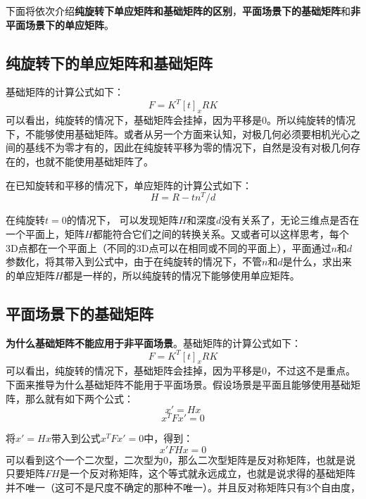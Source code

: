 下面将依次介绍\textbf{纯旋转下单应矩阵和基础矩阵的区别}，\textbf{平面场景下的基础矩阵}和\textbf{非平面场景下的单应矩阵}。

\subsection{纯旋转下的单应矩阵和基础矩阵}

基础矩阵的计算公式如下：
\begin{equation}
	F = K^T[t]_x RK
\end{equation}
可以看出，纯旋转的情况下，基础矩阵会挂掉，因为平移是0。所以纯旋转的情况下，不能够使用基础矩阵。或者从另一个方面来认知，对极几何必须要相机光心之间的基线不为零才有的，因此在纯旋转平移为零的情况下，自然是没有对极几何存在的，也就不能使用基础矩阵了。



在已知旋转和平移的情况下，单应矩阵的计算公式如下：
\begin{equation}
	H = R - tn^T/d
\end{equation}


在纯旋转$t = 0$的情况下， 可以发现矩阵$H$和深度$d$没有关系了，无论三维点是否在一个平面上，矩阵$H$都能符合它们之间的转换关系。又或者可以这样思考，每个3D点都在一个平面上（不同的3D点可以在相同或不同的平面上），平面通过$n$和$d$参数化，将其带入到公式中，由于在纯旋转的情况下，不管$n$和$d$是什么，求出来的单应矩阵$H$都是一样的，所以纯旋转的情况下能够使用单应矩阵。





\subsection{平面场景下的基础矩阵}


\textbf{为什么基础矩阵不能应用于非平面场景}。基础矩阵的计算公式如下：
\begin{equation}
	F = K^T[t]_x RK
\end{equation}
可以看出，纯旋转的情况下，基础矩阵会挂掉，因为平移是0，不过这不是重点。下面来推导为什么基础矩阵不能用于平面场景。假设场景是平面且能够使用基础矩阵，那么就有如下两个公式：
\begin{equation}
	x' = Hx
\end{equation}
\begin{equation}
	x^TFx' = 0
\end{equation}

将$x' = Hx$带入到公式$x^TFx'=0$中，得到：
\begin{equation}
	x'FHx = 0
\end{equation}
可以看到这个一个二次型，二次型为0，那么二次型矩阵是反对称矩阵，也就是说只要矩阵$FH$是一个反对称矩阵，这个等式就永远成立，也就是说求得的基础矩阵并不唯一（这可不是尺度不确定的那种不唯一）。并且反对称矩阵只有3个自由度，

